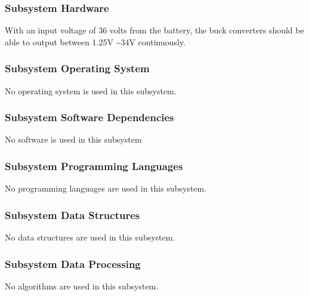 \subsubsection{Subsystem Hardware}
With an input voltage of 36 volts from the battery, the buck converters should be able to output between 1.25V \textasciitilde 34V continuously.

\subsubsection{Subsystem Operating System}
No operating system is used in this subsystem.

\subsubsection{Subsystem Software Dependencies}
No software is used in this subsystem

\subsubsection{Subsystem Programming Languages}
No programming languages are used in this subsystem.

\subsubsection{Subsystem Data Structures}
No data structures are used in this subsystem.

\subsubsection{Subsystem Data Processing}
No algorithms are used in this subsystem.
